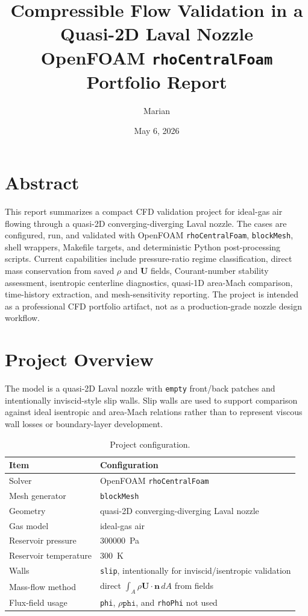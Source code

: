 \documentclass[11pt,a4paper]{article}
\title{\textbf{Compressible Flow Validation in a Quasi-2D Laval Nozzle}\\
\large OpenFOAM \texttt{rhoCentralFoam} Portfolio Report}
\author{Marian}
\date{May 6, 2026}
\begin{document}
\maketitle

\section{Abstract}

This report summarizes a compact CFD validation project for ideal-gas air flowing through a quasi-2D converging-diverging Laval nozzle. The cases are configured, run, and validated with OpenFOAM \texttt{rhoCentralFoam}, \texttt{blockMesh}, shell wrappers, Makefile targets, and deterministic Python post-processing scripts. Current capabilities include pressure-ratio regime classification, direct mass conservation from saved \(\rho\) and \(\mathbf{U}\) fields, Courant-number stability assessment, isentropic centerline diagnostics, quasi-1D area-Mach comparison, time-history extraction, and mesh-sensitivity reporting. The project is intended as a professional CFD portfolio artifact, not as a production-grade nozzle design workflow.

\section{Project Overview}

The model is a quasi-2D Laval nozzle with \texttt{empty} front/back patches and intentionally inviscid-style slip walls. Slip walls are used to support comparison against ideal isentropic and area-Mach relations rather than to represent viscous wall losses or boundary-layer development.

\begin{table}[tbp]
\centering
\caption{Project configuration.}
\begin{tabular}{ll}
\toprule
Item & Configuration \\
\midrule
Solver & OpenFOAM \texttt{rhoCentralFoam} \\
Mesh generator & \texttt{blockMesh} \\
Geometry & quasi-2D converging-diverging Laval nozzle \\
Gas model & ideal-gas air \\
Reservoir pressure & \SI{300000}{Pa} \\
Reservoir temperature & \SI{300}{K} \\
Walls & \texttt{slip}, intentionally for inviscid/isentropic validation \\
Mass-flow method & direct \(\int_A \rho \mathbf{U}\cdot\mathbf{n}\,dA\) from fields \\
Flux-field usage & \texttt{phi}, \(\rho\texttt{phi}\), and \texttt{rhoPhi} not used \\
\bottomrule
\end{tabular}
\end{table}
\end{document}
